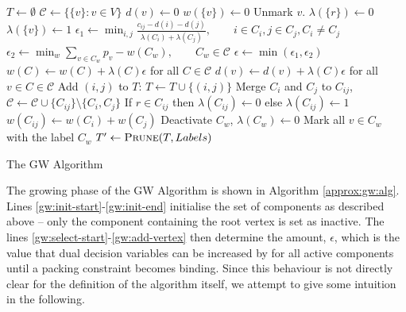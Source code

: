  
 \begin{algorithm}[h!]
   \begin{algorithmic}[1]
     \State $T \gets \emptyset$ \label{gw:init-start}
     \State $\mathcal{C} \gets \{\{v\} : v \in V\}$
       \State $d(v) \gets 0$
       \State $w(\{v\}) \gets 0$
       \State Unmark $v$.
         \State $\lambda(\{r\}) \gets 0$
       \Else
         \State $\lambda(\{v\}) \gets 1$
       \EndIf
     \EndFor \label{gw:init-end}
     \State $\epsilon_1 \gets \min_{i,j} \frac{c_{ij} - d(i) - d(j)}{\lambda (C_i) + \lambda(C_j)},
     \qquad i \in C_i, j \in C_j, C_i \neq C_j$ \label{gw:select-start}
     \State $\epsilon_2 \gets \min_{w} \sum_{v \in C_w} p_v - w(C_w), \qquad C_w \in \mathcal{C}$
     \State $\epsilon \gets \min(\epsilon_1, \epsilon_2)$ 
     \State $w(C) \gets w(C) + \lambda(C) \epsilon$ for all $C \in \mathcal{C}$ \label{gw:add-component}
     \State $d(v) \gets d(v) + \lambda(C) \epsilon$ for all $v \in C \in \mathcal{C}$ \label{gw:add-vertex}
     \State Add $(i,j)$ to $T$: $T \gets T \cup \{(i,j)\}$
     \State Merge $C_i$ and $C_j$ to $C_{ij}$,
     $\mathcal{C} \gets \mathcal{C} \cup \{C_{ij}\} \setminus \{C_i, C_j\}$
     \State If $r \in C_{ij}$ then $\lambda(C_{ij}) \gets 0$ else $\lambda(C_{ij}) \gets 1$
     \State $w(C_{ij}) \gets w(C_i) + w(C_j)$
     \Else
     \State Deactivate $C_w$, $\lambda(C_w) \gets 0$
     \State Mark all $v \in C_w$ with the label $C_w$
     \EndIf
     \EndWhile
     \State $T' \gets \Call{Prune}{T, Labels}$ 
   \EndProcedure
 \end{algorithmic}
 \caption{The GW Algorithm}\label{approx:gw:alg}
 \end{algorithm}

 The growing phase of the GW Algorithm is shown in Algorithm \ref{approx:gw:alg}. Lines \ref{gw:init-start}-\ref{gw:init-end}
 initialise the set of components as described above -- only the component containing the root vertex is set as inactive.
 The lines \ref{gw:select-start}-\ref{gw:add-vertex} then determine the amount, $\epsilon$, which is
 the value that dual decision variables
 can be increased by for all active components
 until a packing constraint becomes binding. Since this behaviour is not directly clear for the definition of the algorithm itself,
  we attempt to give some intuition in the following.

